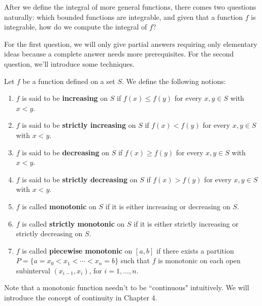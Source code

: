 	\begin{remarkenv}
		After we define the integral of more general functions, there comes two questions naturally: which bounded functions are integrable, and given that a function $f$ is integrable, how do we compute the integral of $f$? 
		
		For the first question, we will only give partial answers requiring only elementary ideas because a complete answer needs more prerequisites. For the second question, we'll introduce some techniques. 
		
	\end{remarkenv}
	\begin{definitionenv}
	Let \(f\) be a function defined on a set \(S\). We define the following notions:
	    \begin{enumerate}
            \item \(f\) is said to be \textbf{increasing} on \(S\) if \(f(x)\le f(y)\) for every \(x,y\in S\) with \(x<y\).

            \item \(f\) is said to be \textbf{strictly increasing} on \(S\) if \(f(x)<f(y)\) for every \(x,y\in S\) with \(x<y\).

            \item \(f\) is said to be \textbf{decreasing} on \(S\) if \(f(x)\ge f(y)\) for every \(x,y\in S\) with \(x<y\).

            \item \(f\) is said to be \textbf{strictly decreasing} on \(S\) if \(f(x)>f(y)\) for every \(x,y\in S\) with \(x<y\).

            \item \(f\) is called \textbf{monotonic} on \(S\) if it is either increasing or decreasing on \(S\).

            \item \(f\) is called \textbf{strictly monotonic} on \(S\) if it is either strictly increasing or strictly decreasing on \(S\).

            \item \(f\) is called \textbf{piecewise monotonic} on \([a,b]\) if there exists a partition \(P=\{a=x_0<x_1<\cdots<x_n=b\}\) such that \(f\) is monotonic on each open subinterval \((x_{i-1},x_i)\), for \(i=1,\dots,n\).
        \end{enumerate}
    \end{definitionenv}
	\begin{remarkenv}
		Note that a monotonic function needn't to be ``continuous" intuitively. We will introduce the concept of continuity in Chapter 4.
	\end{remarkenv}
